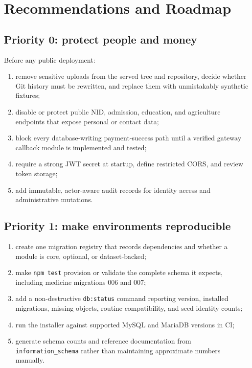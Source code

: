 \documentclass[12pt,a4paper,oneside]{report}
\newcommand{\code}[1]{\texttt{#1}}
\begin{document}
\chapter{Recommendations and Roadmap}

\section{Priority 0: protect people and money}

Before any public deployment:

\begin{enumerate}
  \item remove sensitive uploads from the served tree and repository, decide whether Git history
        must be rewritten, and replace them with unmistakably synthetic fixtures;
  \item disable or protect public NID, admission, education, and agriculture endpoints that expose
        personal or contact data;
  \item block every database-writing payment-success path until a verified gateway callback module
        is implemented and tested;
  \item require a strong JWT secret at startup, define restricted CORS, and review token storage;
  \item add immutable, actor-aware audit records for identity access and administrative mutations.
\end{enumerate}

\section{Priority 1: make environments reproducible}

\begin{enumerate}
  \item create one migration registry that records dependencies and whether a module is core,
        optional, or dataset-backed;
  \item make \code{npm test} provision or validate the complete schema it expects, including
        medicine migrations 006 and 007;
  \item add a non-destructive \code{db:status} command reporting version, installed migrations,
        missing objects, routine compatibility, and seed identity counts;
  \item run the installer against supported MySQL and MariaDB versions in CI;
  \item generate schema counts and reference documentation from \code{information\_schema} rather
        than maintaining approximate numbers manually.
\end{enumerate}
\end{document}
